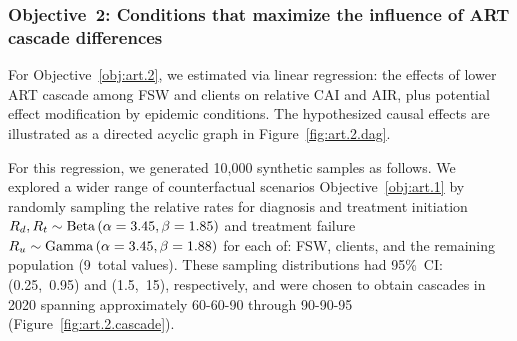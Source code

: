\subsubsection{Objective~2: Conditions that maximize the influence of ART cascade differences}\label{art.meth.obj.2}
For Objective~\ref{obj:art.2}, we estimated via linear regression:
the effects of lower ART cascade among FSW and clients on relative CAI and AIR,
plus potential effect modification by epidemic conditions.
The hypothesized causal effects are illustrated
as a directed acyclic graph in Figure~\ref{fig:art.2.dag}.
\par
For this regression, we generated 10,000 synthetic samples as follows.
We explored a wider range of counterfactual scenarios \vs Objective~\ref{obj:art.1}
by randomly sampling the relative rates for
diagnosis and treatment initiation $R_d, R_t \sim \textnormal{Beta}\,(\alpha=3.45,\beta=1.85)$
and treatment failure $R_u \sim \textnormal{Gamma}\,(\alpha=3.45,\beta=1.88)$
for each of: FSW, clients, and the remaining population (9~total values).
These sampling distributions had 95\%~CI: (0.25,~0.95) and (1.5,~15), respectively,
and were chosen to obtain cascades in 2020 spanning
approximately \mbox{60-60-90} through \mbox{90-90-95} (Figure~\ref{fig:art.2.cascade}). %
